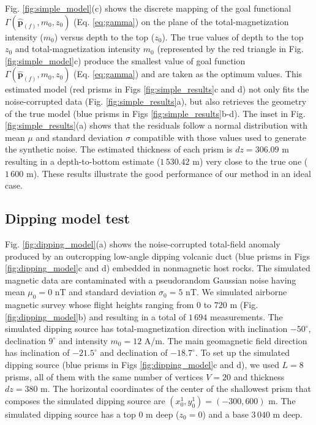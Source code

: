 Fig. \ref{fig:simple_model}(c) shows the discrete mapping of the goal functional 
$\Gamma (\hat{\mathbf{p}}_{(f)}, m_{0}, z_{0})$ (Eq. \ref{eq:gamma}) on the plane of the total-magnetization intensity ($ m_0 $) versus depth to the top ($ z_0 $). 
The true values of depth to the top $ z_0 $ and total-magnetization intensity $ m_0 $ (represented by the red triangle in Fig. \ref{fig:simple_model}c) produce 
the smallest value of goal function $\Gamma (\hat{\mathbf{p}}_{(f)}, m_{0}, z_{0})$
(Eq. \ref{eq:gamma}) and are taken as the optimum values.
This estimated model (red prisms in Figs \ref{fig:simple_results}c and d) 
not only fits the noise-corrupted data (Fig. \ref{fig:simple_results}a), 
but also retrieves the geometry of the true model (blue prisms in Figs \ref{fig:simple_results}b-d). 
The inset in Fig. \ref{fig:simple_results}(a) shows that the residuals follow a normal distribution with mean $ \mu $ and standard deviation $ \sigma $ compatible with those values used to generate the synthetic noise. 
The estimated thickness of each prism is $ dz = 306.09 $ m resulting in a depth-to-bottom estimate ($ 1\,530.42$ m) very close to the true one ($ 1\,600 $ m). 
These results illustrate the good performance of our method in an ideal case.


\subsection{Dipping model test}

Fig. \ref{fig:dipping_model}(a) shows the noise-corrupted total-field anomaly produced by an outcropping low-angle dipping volcanic duct (blue prisms in Figs \ref{fig:dipping_model}c and d) embedded in nonmagnetic host rocks. 
The simulated magnetic data are contaminated with a pseudorandom Gaussian noise having mean $ \mu_0=0 $ nT and standard deviation $ \sigma_0 = 5 $ nT.
We simulated airborne magnetic survey whose flight heights ranging from 0 to $ 720 $ m
(Fig. \ref{fig:dipping_model}b) and resulting in a total of $ 1\,694 $ measurements.
The simulated dipping source has total-magnetization direction with inclination 
$ -50^\circ $, declination $ 9^\circ $ and intensity $ m_0 = 12 $ A/m.
The main geomagnetic field direction has inclination of $ -21.5^\circ $ and declination of $ -18.7^\circ $.
To set up the simulated dipping source (blue prisms in Figs \ref{fig:dipping_model}c and d),
we used $L=8$ prisms, all of them with the same number of vertices $ V = 20 $ and thickness 
$ dz = 380 $ m. 
The horizontal coordinates of the center of the shallowest prism that composes the
simulated dipping source are $ (x_0^1, y_0^1) = (-300, 600) $ m. 
The simulated dipping source has a top 0 m deep ($z_0 = 0$) and a base $ 3\,040 $ m deep.

